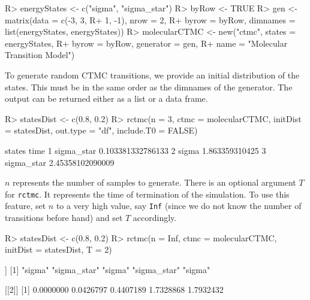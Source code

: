 \documentclass[
  nojss]{jss}
\begin{document}
\begin{CodeChunk}

\begin{CodeInput}
R> energyStates <- c("sigma", "sigma_star")
R> byRow <- TRUE
R> gen <- matrix(data = c(-3, 3,
R+                        1, -1), nrow = 2,
R+               byrow = byRow, dimnames = list(energyStates, energyStates))
R> molecularCTMC <- new("ctmc", states = energyStates, 
R+                  byrow = byRow, generator = gen, 
R+                  name = "Molecular Transition Model")      
\end{CodeInput}
\end{CodeChunk}

To generate random CTMC transitions, we provide an initial distribution of the states. This must be in the same order as the dimnames of the generator. The output can be returned either as a list or a data frame.

\begin{CodeChunk}

\begin{CodeInput}
R> statesDist <- c(0.8, 0.2)
R> rctmc(n = 3, ctmc = molecularCTMC, initDist = statesDist, out.type = "df", include.T0 = FALSE)
\end{CodeInput}

\begin{CodeOutput}
      states              time
1 sigma_star 0.103381332786133
2      sigma    1.863359310425
3 sigma_star  2.45358102090009
\end{CodeOutput}
\end{CodeChunk}

\(n\) represents the number of samples to generate. There is an optional argument \(T\) for \texttt{rctmc}. It represents the time of termination of the simulation. To use this feature, set \(n\) to a very high value, say \texttt{Inf} (since we do not know the number of transitions before hand) and set \(T\) accordingly.

\begin{CodeChunk}

\begin{CodeInput}
R> statesDist <- c(0.8, 0.2)
R> rctmc(n = Inf, ctmc = molecularCTMC, initDist = statesDist, T = 2)
\end{CodeInput}

\begin{CodeOutput}
[[1]]
[1] "sigma"      "sigma_star" "sigma"      "sigma_star" "sigma"     

[[2]]
[1] 0.0000000 0.0426797 0.4407189 1.7328868 1.7932432
\end{CodeOutput}
\end{CodeChunk}
\end{document}
